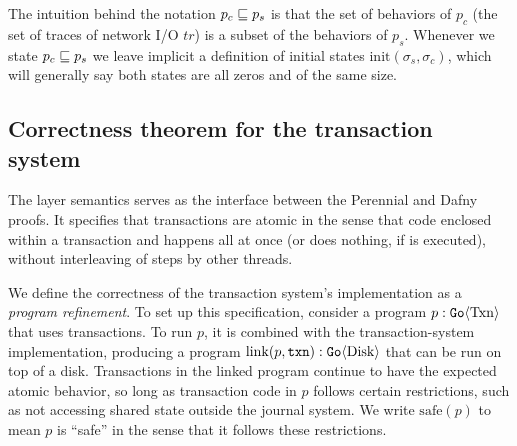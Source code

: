 The intuition behind the notation $p_{c} \sqsubseteq p_{s}$ is that the set of
behaviors of $p_{c}$ (the set of traces of network I/O $tr$) is a subset of the
behaviors of $p_{s}$. Whenever we state $p_{c} \sqsubseteq p_{s}$ we leave implicit
a definition of initial states $\mathrm{init}(\sigma_{s}, \sigma_{c})$, which
will generally say both states are all zeros and of the same size.

\subsection{Correctness theorem for the transaction system}
\label{sec:proof:txn}

The  layer semantics serves as the interface between the Perennial and Dafny
proofs.  It specifies that transactions are atomic in the sense that code
enclosed within a transaction  and  happens all at once (or
does nothing, if  is executed), without interleaving of steps by other
threads.

We define the correctness of the transaction system's implementation as a
\emph{program refinement}.
To set up this specification, consider a program $p : \mathtt{Go}\langle \mathrm{Txn} \rangle$ that
uses transactions.
To run $p$, it is combined with the transaction-system implementation, producing
a program $\mathrm{link}(p, \texttt{txn}) : \mathtt{Go}\langle \mathrm{Disk} \rangle$ that can be run on
top of a disk.
Transactions in the linked program continue to have the expected atomic
behavior, so long as transaction code in $p$ follows certain restrictions, such
as not accessing shared state outside the journal system.  We write
$\mathrm{safe}(p)$ to mean $p$ is ``safe'' in the sense that it follows these restrictions.

%

